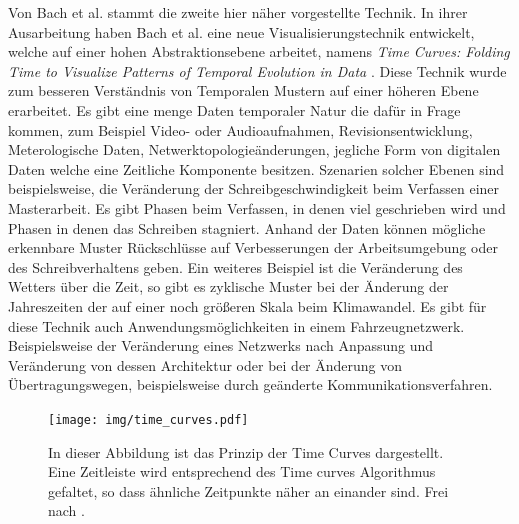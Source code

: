 \documentclass[draft=false
              ,paper=a4
              ,twoside=false
              ,fontsize=11pt
              ,headsepline
              ,BCOR10mm
              ,DIV11
              ]{scrbook}
\begin{document}

Von Bach et al. stammt die zweite hier näher vorgestellte Technik. In ihrer Ausarbeitung haben Bach et al. eine neue Visualisierungstechnik entwickelt, welche auf einer hohen Abstraktionsebene arbeitet, namens \textit{Time Curves: Folding Time to Visualize Patterns of Temporal Evolution in Data} \cite{bach_time_2016}. Diese Technik wurde zum besseren Verständnis von Temporalen Mustern auf einer höheren Ebene erarbeitet. Es gibt eine menge Daten temporaler Natur die dafür in Frage kommen, zum Beispiel Video- oder Audioaufnahmen, Revisionsentwicklung, Meterologische Daten, Netwerktopologieänderungen, jegliche Form von digitalen Daten welche eine Zeitliche Komponente besitzen. Szenarien solcher Ebenen sind beispielsweise, die Veränderung der Schreibgeschwindigkeit beim Verfassen einer Masterarbeit. Es gibt Phasen beim Verfassen, in denen viel geschrieben wird und Phasen in denen das Schreiben stagniert. Anhand der Daten können mögliche erkennbare Muster Rückschlüsse auf Verbesserungen der Arbeitsumgebung oder des Schreibverhaltens geben. Ein weiteres Beispiel ist die Veränderung des Wetters über die Zeit, so gibt es zyklische Muster bei der Änderung der Jahreszeiten der auf einer noch größeren Skala beim Klimawandel. Es gibt für diese Technik auch Anwendungsmöglichkeiten in einem Fahrzeugnetzwerk. Beispielsweise der Veränderung eines Netzwerks nach Anpassung und Veränderung von dessen Architektur oder bei der Änderung von Übertragungswegen, beispielsweise durch geänderte Kommunikationsverfahren. 

\begin{figure}[htbp]
  \centering
  \texttt{[image: img/time\_curves.pdf]}
  \caption{In dieser Abbildung ist das Prinzip der Time Curves dargestellt. Eine Zeitleiste wird entsprechend des Time curves Algorithmus gefaltet, so dass ähnliche Zeitpunkte näher an einander sind. Frei nach \cite{bach_time_2016}.}
  \label{fig:time_curves}
\end{figure}
\end{document}
